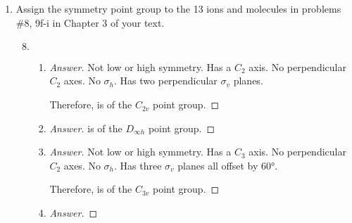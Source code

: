 \documentclass[../psets.tex]{subfiles}
\begin{document}
\begin{enumerate}[label={\Roman*)}]
\begin{enumerate}[label={\textbf{3.\arabic*}}]
\begin{center}
        \end{center}
        \setcounter{enumii}{28}
        \item Sketch the most likely structure of  and explain your reasoning.
        \begin{center}
        \end{center}
        \begin{proof}[Answer]
            Bromine is more electropositive than chlorine. Thus, by Bent's rule, the bromines will bond to the hybrid orbitals with greater $s$-character (the equatorial $sp^2$ ones) first.
        \end{proof}
    \end{enumerate}
    \newpage
    \item Assign the symmetry point group to the 13 ions and molecules in problems \#8, 9f-i in Chapter 3 of your text.
    \begin{enumerate}[label={\textbf{3.\arabic*}}]
        \setcounter{enumii}{7}
        \item ${\color{white}x}$
        \begin{enumerate}[label={\textbf{\alph*.}}]
            \item {}
            \begin{proof}[Answer]
                Not low or high symmetry. Has a $C_2$ axis. No perpendicular $C_2$ axes. No $\sigma_h$. Has two perpendicular $\sigma_v$ planes.\par
                Therefore,  is of the $C_{2v}$ point group.
            \end{proof}
            \item {}
            \begin{proof}[Answer]
                 is of the $D_{\infty h}$ point group.
            \end{proof}
            \item {}
            \begin{proof}[Answer]
                Not low or high symmetry. Has a $C_3$ axis. No perpendicular $C_2$ axes. No $\sigma_h$. Has three $\sigma_v$ planes all offset by $\ang{60}$.\par
                Therefore,  is of the $C_{3v}$ point group.
            \end{proof}
            \item {}
            \begin{proof}[Answer]

\end{proof}
\end{enumerate}
\end{enumerate}
\end{enumerate}
\end{document}
